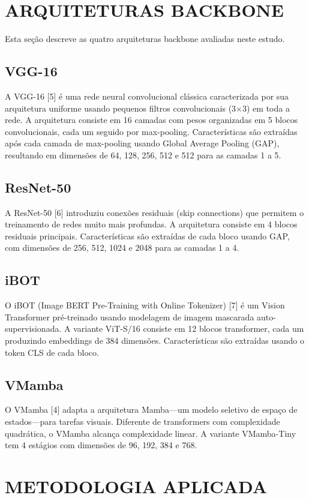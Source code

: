 \documentclass[conference]{IEEEtran}
\begin{document}
\section{ARQUITETURAS BACKBONE}

Esta seção descreve as quatro arquiteturas backbone avaliadas neste estudo.

\subsection{VGG-16}
A VGG-16 [5] é uma rede neural convolucional clássica caracterizada por sua arquitetura uniforme usando pequenos filtros convolucionais (3×3) em toda a rede. A arquitetura consiste em 16 camadas com pesos organizadas em 5 blocos convolucionais, cada um seguido por max-pooling. Características são extraídas após cada camada de max-pooling usando Global Average Pooling (GAP), resultando em dimensões de 64, 128, 256, 512 e 512 para as camadas 1 a 5.

\subsection{ResNet-50}
A ResNet-50 [6] introduziu conexões residuais (skip connections) que permitem o treinamento de redes muito mais profundas. A arquitetura consiste em 4 blocos residuais principais. Características são extraídas de cada bloco usando GAP, com dimensões de 256, 512, 1024 e 2048 para as camadas 1 a 4.

\subsection{iBOT}
O iBOT (Image BERT Pre-Training with Online Tokenizer) [7] é um Vision Transformer pré-treinado usando modelagem de imagem mascarada auto-supervisionada. A variante ViT-S/16 consiste em 12 blocos transformer, cada um produzindo embeddings de 384 dimensões. Características são extraídas usando o token CLS de cada bloco.

\subsection{VMamba}
O VMamba [4] adapta a arquitetura Mamba—um modelo seletivo de espaço de estados—para tarefas visuais. Diferente de transformers com complexidade quadrática, o VMamba alcança complexidade linear. A variante VMamba-Tiny tem 4 estágios com dimensões de 96, 192, 384 e 768.


\section{METODOLOGIA APLICADA}
\end{document}
